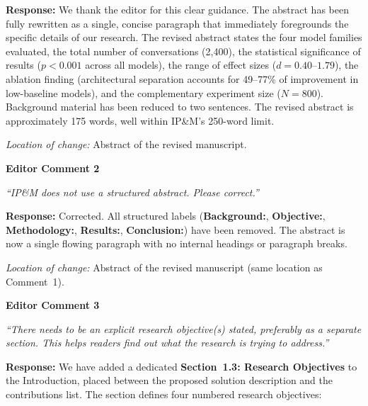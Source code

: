 \documentclass[12pt,a4paper]{article}
\begin{document}
\textbf{Response:} We thank the editor for this clear guidance. The abstract has been fully rewritten as a single, concise paragraph that immediately foregrounds the specific details of our research. The revised abstract states the four model families evaluated, the total number of conversations (2,400), the statistical significance of results ($p < 0.001$ across all models), the range of effect sizes ($d = 0.40$--$1.79$), the ablation finding (architectural separation accounts for 49--77\% of improvement in low-baseline models), and the complementary experiment size ($N = 800$). Background material has been reduced to two sentences. The revised abstract is approximately 175 words, well within IP\&M's 250-word limit.

\textit{Location of change:} Abstract of the revised manuscript.

\vspace{0.5cm}


\noindent \textbf{Editor Comment 2}

\begin{editorbox}
\textit{``IP\&M does not use a structured abstract. Please correct.''}
\end{editorbox}

\textbf{Response:} Corrected. All structured labels (\textbf{Background:}, \textbf{Objective:}, \textbf{Methodology:}, \textbf{Results:}, \textbf{Conclusion:}) have been removed. The abstract is now a single flowing paragraph with no internal headings or paragraph breaks.

\textit{Location of change:} Abstract of the revised manuscript (same location as Comment~1).

\vspace{0.5cm}


\noindent \textbf{Editor Comment 3}

\begin{editorbox}
\textit{``There needs to be an explicit research objective(s) stated, preferably as a separate section. This helps readers find out what the research is trying to address.''}
\end{editorbox}

\textbf{Response:} We have added a dedicated \textbf{Section~1.3: Research Objectives} to the Introduction, placed between the proposed solution description and the contributions list. The section defines four numbered research objectives:
\end{document}
